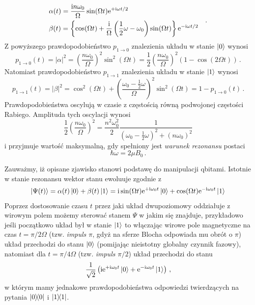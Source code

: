 \documentclass{myclass}
\begin{document}
\begin{equation*}
\begin{split}
    &\alpha(t) = \frac{\mathrm{i} n\omega_0}{\Omega}\sin(\Omega t)\mathrm{e}^{+\mathrm{i}\omega t/2}\\
    &\beta(t) = \left\{\cos(\Omega t) +\frac{\mathrm{i}}{\Omega}\left(\frac{1}{2}\omega - \omega_0\right)\sin(\Omega t)\right\}\mathrm{e}^{-\mathrm{i}\omega t/2}
\end{split}\quad.
\end{equation*}
Z powyższego prawdopodobieństwo \(p_{1\to0}\) znalezienia układu w stanie \(\ket{0}\) wynosi
\begin{equation*}
        p_{1\to0}(t) = |\alpha|^2 = \left(\frac{n\omega_0}{\Omega}\right)^2\sin^2(\Omega t) = \frac{1}{2}\left(\frac{n\omega_0}{\Omega}\right)^2(1-\cos(2\Omega t))\,.
\end{equation*}
Natomiast prawdopodobieństwo \(p_{1\to1}\) znalezienia układu w stanie \(\ket{1}\) wynosi
\begin{equation*}
        p_{1\to1}(t) = |\beta|^2 =\cos^2(\Omega t) + \left(\frac{\omega_0 - \frac{1}{2}\omega}{\Omega}\right)^2\sin^2(\Omega t) = 1 - p_{1\to 0}(t)\,.
\end{equation*}
Prawdopodobieństwa oscylują w czasie z częstością równą podwojonej częstości Rabiego. Amplituda tych
oscylacji wynosi
\begin{equation*}
    \frac{1}{2}\left(\frac{n\omega_0}{\Omega}\right)^2 = \frac{n^2\omega_0^2}{2}\frac{1}{\left(\omega_0 - \frac{1}{2}\omega\right)^2 +
    \left(n\omega_0\right)^2}
\end{equation*}
i przyjmuje wartość maksymalną, gdy spełniony jest \textit{warunek rezonansu} postaci
\begin{equation*}
    \hbar\omega = 2\mu B_0\,.
\end{equation*}

Zauważmy, iż opisane zjawisko stanowi podstawę do manipulacji qbitami. Istotnie w stanie rezonansu
wektor stanu ewoluuje zgodnie z
\begin{equation*}
    \ket{\Psi(t)} = \alpha(t)\ket{0} + \beta(t)\ket{1} = \mathrm{i}\sin(\Omega t)\mathrm{e}^{+\mathrm{i}\omega_0 t}\ket{0} + \cos(\Omega t)\mathrm{e}^{-\mathrm{i}\omega_0 t}\ket{1}
\end{equation*}
Poprzez dostosowanie czasu \(t\) przez jaki układ dwupoziomowy oddziałuje z wirowym polem możemy
sterować stanem \(\Psi\) w jakim się znajduje, przykładowo jeśli początkowo układ był w stanie
\(\ket{1}\) to włączając wirowe pole magnetyczne na czas \(t = \pi/2\Omega\) (tzw. \textit{impuls
\(\pi\)}, gdyż na sferze Blocha odpowiada mu obrót o \(\pi\)) układ przechodzi do stanu \(\ket{0}\)
(pomijając nieistotny globalny czynnik fazowy), natomiast dla \(t = \pi/4\Omega\) (tzw.
\textit{impuls \(\pi/2\)}) układ przechodzi do stanu
\begin{equation*}
    \frac{1}{\sqrt{2}}\left(\mathrm{i}\mathrm{e}^{+\mathrm{i}\omega_0t}\ket{0} + \mathrm{e}^{-\mathrm{i}\omega_0t}\ket{1}\right)\,,
\end{equation*}
w którym mamy jednakowe prawdopodobieństwa odpowiedzi twierdzących na pytania \(\dyad{0}\) i
\(\dyad{1}\).
\end{document}
